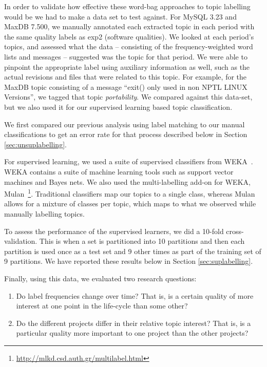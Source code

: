 \documentclass{acm_proc_article-sp}
\begin{document}
In order to validate how effective these word-bag approaches to topic labelling would be we had to make a data set to test against.  For MySQL 3.23 and MaxDB 7.500, we manually annotated each extracted topic in each period with the same quality labels as \textsf{exp2} (software qualities). We looked at each period's topics, and assessed what the data -- consisting of the frequency-weighted word lists and messages -- suggested was the topic for that period. We were able to pinpoint the appropriate label using auxiliary information as well, such as the actual revisions and files that were related to this topic. For example, for the MaxDB topic consisting of a message ``exit() only used in non NPTL LINUX Versions'', we tagged that topic \emph{portability}. We compared against this data-set, but we also used it for our supervised learning based topic classification.

We first compared our previous analysis using label matching to our manual classifications to get an error rate for that process described below in Section \ref{sec:unsuplabelling}. 

For supervised learning, we used a suite of supervised classifiers from WEKA~\cite{weka09}. WEKA contains a suite of machine learning tools such as support vector machines and Bayes nets. We also used the multi-labelling add-on for WEKA, Mulan~\cite{mulan}\footnote{\url{http://mlkd.csd.auth.gr/multilabel.html}}. Traditional classifiers map our topics to a single class, whereas Mulan allows for a mixture of classes per topic, which maps to what we observed while manually labelling topics.

To assess the performance of the supervised learners, we did a 10-fold cross-validation. This is when a set is partitioned into 10 partitions and then each partition is used once as a test set and 9 other times as part of the training set of 9 partitions. We have reported these results below in Section \ref{sec:suplabelling}.

Finally, using this data, we evaluated two research questions:
\begin{enumerate}
\item Do label frequencies change over time? That is, is a certain quality of more interest at one point in the life-cycle than some other? 
\item  Do the different projects differ in their relative topic interest? That is, is a particular quality more important to one project than the other projects?  
\end{enumerate}
\end{document}
